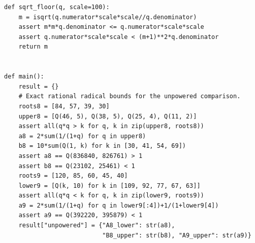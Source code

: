 \documentclass[11pt,a4paper,oneside]{report}
\theoremstyle{definition}
\theoremstyle{remark}
\begin{document}
\begin{lstlisting}
def sqrt_floor(q, scale=100):
    m = isqrt(q.numerator*scale*scale//q.denominator)
    assert m*m*q.denominator <= q.numerator*scale*scale
    assert q.numerator*scale*scale < (m+1)**2*q.denominator
    return m


def main():
    result = {}
    # Exact rational radical bounds for the unpowered comparison.
    roots8 = [84, 57, 39, 30]
    upper8 = [Q(46, 5), Q(38, 5), Q(25, 4), Q(11, 2)]
    assert all(q*q > k for q, k in zip(upper8, roots8))
    a8 = 2*sum(1/(1+q) for q in upper8)
    b8 = 10*sum(Q(1, k) for k in [30, 41, 54, 69])
    assert a8 == Q(836840, 826761) > 1
    assert b8 == Q(23102, 25461) < 1
    roots9 = [120, 85, 60, 45, 40]
    lower9 = [Q(k, 10) for k in [109, 92, 77, 67, 63]]
    assert all(q*q < k for q, k in zip(lower9, roots9))
    a9 = 2*sum(1/(1+q) for q in lower9[:4])+1/(1+lower9[4])
    assert a9 == Q(392220, 395879) < 1
    result["unpowered"] = {"A8_lower": str(a8),
                           "B8_upper": str(b8), "A9_upper": str(a9)}


\end{lstlisting}
\end{document}
